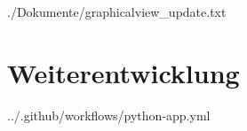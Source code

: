 \begin{minipage}{\textwidth}
	
	{./Dokumente/graphicalview_update.txt}
\end{minipage}

\section{Weiterentwicklung}
\label{sec:anhang-weiterentwicklung}

\begin{minipage}{\textwidth}
	
	{../.github/workflows/python-app.yml}
\end{minipage}